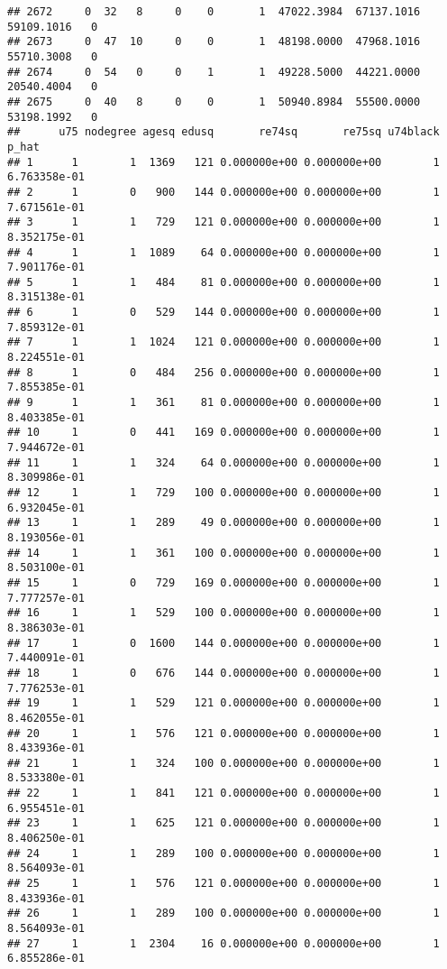 \documentclass[
]{article}
\begin{document}
\begin{enumerate}
\begin{verbatim}
## 2672     0  32   8     0    0       1  47022.3984  67137.1016  59109.1016   0
## 2673     0  47  10     0    0       1  48198.0000  47968.1016  55710.3008   0
## 2674     0  54   0     0    1       1  49228.5000  44221.0000  20540.4004   0
## 2675     0  40   8     0    0       1  50940.8984  55500.0000  53198.1992   0
##      u75 nodegree agesq edusq       re74sq       re75sq u74black         p_hat
## 1      1        1  1369   121 0.000000e+00 0.000000e+00        1  6.763358e-01
## 2      1        0   900   144 0.000000e+00 0.000000e+00        1  7.671561e-01
## 3      1        1   729   121 0.000000e+00 0.000000e+00        1  8.352175e-01
## 4      1        1  1089    64 0.000000e+00 0.000000e+00        1  7.901176e-01
## 5      1        1   484    81 0.000000e+00 0.000000e+00        1  8.315138e-01
## 6      1        0   529   144 0.000000e+00 0.000000e+00        1  7.859312e-01
## 7      1        1  1024   121 0.000000e+00 0.000000e+00        1  8.224551e-01
## 8      1        0   484   256 0.000000e+00 0.000000e+00        1  7.855385e-01
## 9      1        1   361    81 0.000000e+00 0.000000e+00        1  8.403385e-01
## 10     1        0   441   169 0.000000e+00 0.000000e+00        1  7.944672e-01
## 11     1        1   324    64 0.000000e+00 0.000000e+00        1  8.309986e-01
## 12     1        1   729   100 0.000000e+00 0.000000e+00        1  6.932045e-01
## 13     1        1   289    49 0.000000e+00 0.000000e+00        1  8.193056e-01
## 14     1        1   361   100 0.000000e+00 0.000000e+00        1  8.503100e-01
## 15     1        0   729   169 0.000000e+00 0.000000e+00        1  7.777257e-01
## 16     1        1   529   100 0.000000e+00 0.000000e+00        1  8.386303e-01
## 17     1        0  1600   144 0.000000e+00 0.000000e+00        1  7.440091e-01
## 18     1        0   676   144 0.000000e+00 0.000000e+00        1  7.776253e-01
## 19     1        1   529   121 0.000000e+00 0.000000e+00        1  8.462055e-01
## 20     1        1   576   121 0.000000e+00 0.000000e+00        1  8.433936e-01
## 21     1        1   324   100 0.000000e+00 0.000000e+00        1  8.533380e-01
## 22     1        1   841   121 0.000000e+00 0.000000e+00        1  6.955451e-01
## 23     1        1   625   121 0.000000e+00 0.000000e+00        1  8.406250e-01
## 24     1        1   289   100 0.000000e+00 0.000000e+00        1  8.564093e-01
## 25     1        1   576   121 0.000000e+00 0.000000e+00        1  8.433936e-01
## 26     1        1   289   100 0.000000e+00 0.000000e+00        1  8.564093e-01
## 27     1        1  2304    16 0.000000e+00 0.000000e+00        1  6.855286e-01

\end{verbatim}
\end{enumerate}
\end{document}
